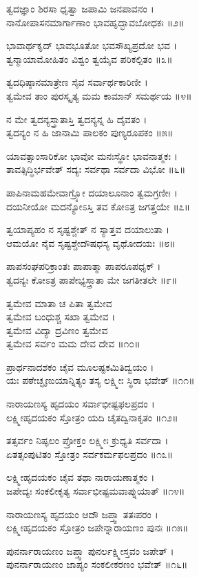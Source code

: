 ತ್ವದಜ್ಞಾಂ ಶಿರಸಾ ಧೃತ್ವಾ ಜಪಾಮಿ ಜನಪಾವನಂ ।\\
ನಾನೋಪಾಸನಮಾರ್ಗಾಣಾಂ ಭಾವಹೃದ್ಭಾವಬೋಧಕಃ ॥೨॥

	ಭಾವಾರ್ಥಕೃದ್ ಭಾವಭೂತೋ ಭವಸೌಖ್ಯಪ್ರದೋ ಭವ ।\\
	ತ್ವನ್ಮಾಯಾಮೋಹಿತಂ ವಿಶ್ವಂ ತ್ವಯೈವ ಪರಿಕಲ್ಪಿತಂ ॥೩॥

ತ್ವದಧಿಷ್ಠಾನಮಾತ್ರೇಣ ಸೈವ ಸರ್ವಾರ್ಥಕಾರಿಣೀ ।\\
ತ್ವಮೇವ ತಾಂ ಪುರಸ್ಕೃತ್ಯ ಮಮ ಕಾಮಾನ್ ಸಮರ್ಥಯ ॥೪॥

	ನ ಮೇ ತ್ವದನ್ಯಸ್ತ್ರಾತಾಸ್ತಿ ತ್ವದನ್ಯನ್ನ ಹಿ ದೈವತಂ ।\\
	ತ್ವದನ್ಯಂ ನ ಹಿ ಜಾನಾಮಿ ಪಾಲಕಂ ಪುಣ್ಯರೂಪಕಂ ॥೫॥

ಯಾವತ್ಸಾಂಸಾರಿಕೋ ಭಾವೋ ಮನಃಸ್ಥೋ ಭಾವನಾತ್ಮಕಃ ।\\
ತಾವತ್ಸಿದ್ಧಿರ್ಭವೇತ್ ಸದ್ಯಃ ಸರ್ವಥಾ ಸರ್ವದಾ ವಿಭೋ ॥೬॥

	ಪಾಪಿನಾಮಹಮೇವಾಗ್ರ್ಯೋ ದಯಾಲೂನಾಂ ತ್ವಮಗ್ರಣೀಃ ।\\
	ದಯನೀಯೋ ಮದನ್ಯೋಽಸ್ತಿ ತವ ಕೋಽತ್ರ ಜಗತ್ತ್ರಯೇ ॥೭॥

ತ್ವಯಾಪ್ಯಹಂ ನ ಸೃಷ್ಟಶ್ಚೇತ್ ನ ಸ್ಯಾತ್ತವ ದಯಾಲುತಾ ।\\
ಆಮಯೋ ನೈವ ಸೃಷ್ಟಶ್ಚೇದೌಷಧಸ್ಯ ವೃಥೋದಯಃ ॥೮॥

	ಪಾಪಸಂಘಪರಿಕ್ರಾಂತಃ ಪಾಪಾತ್ಮಾ ಪಾಪರೂಪಧೃಕ್ ।\\
	ತ್ವದನ್ಯಃ ಕೋಽತ್ರ ಪಾಪೇಭ್ಯಸ್ತ್ರಾತಾ ಮೇ ಜಗತೀತಲೇ ॥೯॥

ತ್ವಮೇವ ಮಾತಾ ಚ ಪಿತಾ ತ್ವಮೇವ \\ತ್ವಮೇವ ಬಂಧುಶ್ಚ ಸಖಾ ತ್ವಮೇವ ।\\
ತ್ವಮೇವ ವಿದ್ಯಾ ದ್ರವಿಣಂ ತ್ವಮೇವ \\ತ್ವಮೇವ ಸರ್ವಂ ಮಮ ದೇವ ದೇವ ॥೧೦॥

	ಪ್ರಾರ್ಥನಾದಶಕಂ ಚೈವ ಮೂಲಷ್ಟಕಮಿತಿದ್ವಯಂ ।\\
	ಯಃ ಪಠೇಚ್ಛೃಣುಯಾನ್ನಿತ್ಯಂ ತಸ್ಯ ಲಕ್ಷ್ಮೀಃ ಸ್ಥಿರಾ ಭವೇತ್ ॥೧೧॥

ನಾರಾಯಣಸ್ಯ ಹೃದಯಂ ಸರ್ವಾಭೀಷ್ಟಫಲಪ್ರದಂ ।\\
ಲಕ್ಷ್ಮೀಹೃದಯಕಂ ಸ್ತೋತ್ರಂ ಯದಿ ಚೈತದ್ವಿನಾಕೃತಂ ॥೧೨॥

	ತತ್ಸರ್ವಂ ನಿಷ್ಫಲಂ ಪ್ರೋಕ್ತಂ ಲಕ್ಷ್ಮೀಃ ಕ್ರುಧ್ಯತಿ ಸರ್ವದಾ ।\\
	ಏತತ್ಸಂಪುಟಿತಂ ಸ್ತೋತ್ರಂ ಸರ್ವಕರ್ಮಫಲಪ್ರದಂ ॥೧೩॥

ಲಕ್ಷ್ಮೀಹೃದಯಕಂ ಚೈವ ತಥಾ ನಾರಾಯಣಾತ್ಮಕಂ ।\\
ಜಪೇದ್ಯಃ ಸಂಕಲೀಕೃತ್ಯ ಸರ್ವಾಭೀಷ್ಟಮವಾಪ್ನುಯಾತ್ ॥೧೪॥

	ನಾರಾಯಣಸ್ಯ ಹೃದಯಂ ಆದೌ ಜಪ್ತ್ವಾ ತತಃಪರಂ ।\\
	ಲಕ್ಷ್ಮೀಹೃದಯಕಂ ಸ್ತೋತ್ರಂ ಜಪೇನ್ನಾರಾಯಣಂ ಪುನಃ ॥೧೫॥

ಪುನರ್ನಾರಾಯಣಂ ಜಪ್ತ್ವಾ ಪುನರ್ಲಕ್ಷ್ಮೀಸ್ತವಂ ಜಪೇತ್ ।\\
ಪುನರ್ನಾರಾಯಣಂ ಜಾಪ್ಯಂ ಸಂಕಲೀಕರಣಂ ಭವೇತ್ ॥೧೬॥

